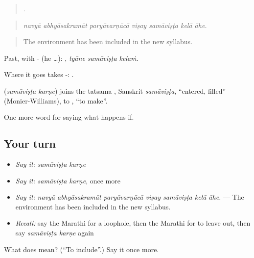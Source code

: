 \begin{quote}
      .
\end{quote}

\begin{quote}
\emph{navyā abhyāsakramāt paryāvarṇācā viṣay samāviṣṭa kelā āhe.}
\end{quote}

\begin{quote}
The environment has been included in the new syllabus.
\end{quote}

Past, with - (he …):   , \emph{tyāne samāviṣṭa kelaṁ}.

Where it goes takes -:  .

\begin{cousinweb}
\textbf{ } (\emph{samāviṣṭa karṇe}) joins the tatsama , Sanskrit \emph{samāviṣṭa}, \textquotedblleft{}entered, filled\textquotedblright{} (Monier-Williams), to , \textquotedblleft{}to make\textquotedblright{}.
\end{cousinweb}

\begin{grammarlens}[title={What you've built}]
One more word for saying what happens if.
\end{grammarlens}

\subsection*{Your turn}
\begin{itemize}
\raggedright
  \item \emph{Say it:} \emph{samāviṣṭa karṇe}
  \item \emph{Say it:} \emph{samāviṣṭa karṇe}, once more
  \item \emph{Say it:} \emph{navyā abhyāsakramāt paryāvarṇācā viṣay samāviṣṭa kelā āhe.} — The environment has been included in the new syllabus.
  \item \emph{Recall:} say the Marathi for a loophole, then the Marathi for to leave out, then say \emph{samāviṣṭa karṇe} again
\end{itemize}

\begin{tcolorbox}[breakable,colback=teal!4,colframe=teal!35!black,title={Before you move on}]
What does   mean? (\textquotedblleft{}To include\textquotedblright{}.) Say it once more.
\end{tcolorbox}
